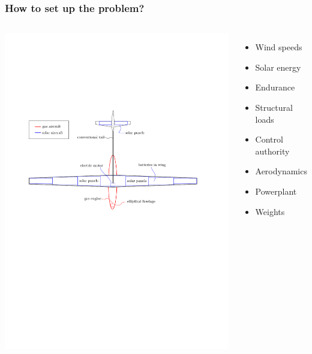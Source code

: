 \documentclass{beamer}
\begin{document}
\begin{frame}
    \frametitle{How to set up the problem?}

    \pause 
    \begin{columns}
        \includegraphics[width=1.0\textwidth]{simpleaircraft.pdf}
        
        \begin{itemize}
            \pause
            \item Wind speeds
            \pause
            \item Solar energy
            \pause
            \item Endurance
            \pause
            \item Structural loads
            \pause
            \item Control authority
            \pause
            \item Aerodynamics
            \pause
            \item Powerplant
            \pause
            \item Weights \\~\\
            \end{itemize}
    \end{columns}
    

\end{frame}
\end{document}
